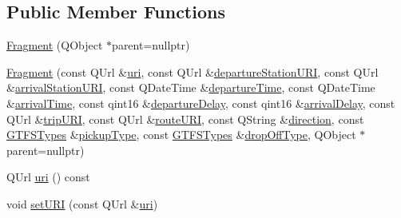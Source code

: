 \subsection*{Public Member Functions}
\begin{DoxyCompactItemize}
\item 
\mbox{\hyperlink{classQRail_1_1Fragments_1_1Fragment_ac973f9f8cc5f7cc3ba452765741de9de}{Fragment}} (Q\+Object $\ast$parent=nullptr)
\item 
\mbox{\hyperlink{classQRail_1_1Fragments_1_1Fragment_a6b9960c74ce3256f2e479d8842d34562}{Fragment}} (const Q\+Url \&\mbox{\hyperlink{classQRail_1_1Fragments_1_1Fragment_ae5f38f826040cb216e345ce6eb26ebb6}{uri}}, const Q\+Url \&\mbox{\hyperlink{classQRail_1_1Fragments_1_1Fragment_a5b64058868e96c5ca56b91405ca51683}{departure\+Station\+U\+RI}}, const Q\+Url \&\mbox{\hyperlink{classQRail_1_1Fragments_1_1Fragment_a196eaba03a9dd9751a011e30a1e37dd4}{arrival\+Station\+U\+RI}}, const Q\+Date\+Time \&\mbox{\hyperlink{classQRail_1_1Fragments_1_1Fragment_a95d2c99a166573817bd8d8aa8b688b5e}{departure\+Time}}, const Q\+Date\+Time \&\mbox{\hyperlink{classQRail_1_1Fragments_1_1Fragment_ae8b17e8f7219d6252ffffcd4e20e7a35}{arrival\+Time}}, const qint16 \&\mbox{\hyperlink{classQRail_1_1Fragments_1_1Fragment_aa0e43583b4d64c688f5fa7e9b13b0855}{departure\+Delay}}, const qint16 \&\mbox{\hyperlink{classQRail_1_1Fragments_1_1Fragment_a0f5ee06943c6cf1dc3ba0e98439e4262}{arrival\+Delay}}, const Q\+Url \&\mbox{\hyperlink{classQRail_1_1Fragments_1_1Fragment_a0aab02000bd98face5322e427ffaa581}{trip\+U\+RI}}, const Q\+Url \&\mbox{\hyperlink{classQRail_1_1Fragments_1_1Fragment_a9313e0c67c93f2e7482071054c005dae}{route\+U\+RI}}, const Q\+String \&\mbox{\hyperlink{classQRail_1_1Fragments_1_1Fragment_a245aaaea9da4258cba1fa53335b05546}{direction}}, const \mbox{\hyperlink{classQRail_1_1Fragments_1_1Fragment_ae3c308ba6dec16f36ecc5dba59f35af3}{G\+T\+F\+S\+Types}} \&\mbox{\hyperlink{classQRail_1_1Fragments_1_1Fragment_afbddff790b1d207eff7adafba09f6e7c}{pickup\+Type}}, const \mbox{\hyperlink{classQRail_1_1Fragments_1_1Fragment_ae3c308ba6dec16f36ecc5dba59f35af3}{G\+T\+F\+S\+Types}} \&\mbox{\hyperlink{classQRail_1_1Fragments_1_1Fragment_a8cb44b415a121dfa2b0c6046df4bea27}{drop\+Off\+Type}}, Q\+Object $\ast$parent=nullptr)
\item 
Q\+Url \mbox{\hyperlink{classQRail_1_1Fragments_1_1Fragment_ae5f38f826040cb216e345ce6eb26ebb6}{uri}} () const
\item 
void \mbox{\hyperlink{classQRail_1_1Fragments_1_1Fragment_a37968aff7ee593ffd07a935e028868c9}{set\+U\+RI}} (const Q\+Url \&\mbox{\hyperlink{classQRail_1_1Fragments_1_1Fragment_ae5f38f826040cb216e345ce6eb26ebb6}{uri}})

\end{DoxyCompactItemize}

